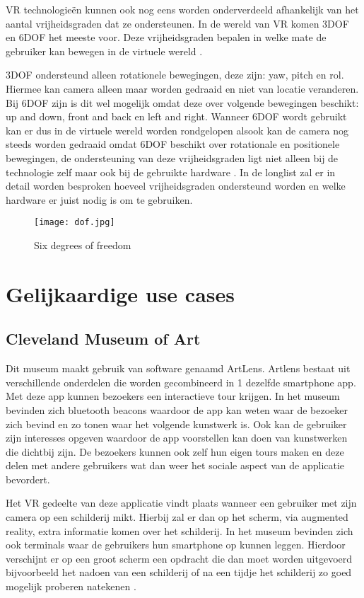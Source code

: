 VR technologieën kunnen ook nog eens worden onderverdeeld afhankelijk van het aantal vrijheidsgraden dat ze ondersteunen. In de wereld van VR komen 3DOF en 6DOF het meeste voor. Deze vrijheidsgraden bepalen in welke mate de gebruiker kan bewegen in de virtuele wereld \autocite{Shenchang1995}.

3DOF ondersteund alleen rotationele bewegingen, deze zijn: yaw, pitch en rol. Hiermee kan camera alleen maar worden gedraaid en niet van locatie veranderen. Bij 6DOF zijn is dit wel mogelijk omdat deze over volgende bewegingen beschikt: up and down, front and back en left and right. 
Wanneer 6DOF wordt gebruikt kan er dus in de virtuele wereld worden rondgelopen alsook kan de camera nog steeds worden gedraaid omdat 6DOF beschikt over rotationale en positionele bewegingen, de ondersteuning van deze vrijheidsgraden ligt niet alleen bij de technologie zelf maar ook bij de gebruikte hardware \autocite{Shenchang1995}. In de longlist zal er in detail worden besproken hoeveel vrijheidsgraden ondersteund worden en welke hardware er juist nodig is om te gebruiken.

\begin{figure}
    \texttt{[image: dof.jpg]}
    \caption{Six degrees of freedom}
    \label{fig:dof}
\end{figure}

\section{Gelijkaardige use cases}
\subsection{Cleveland Museum of Art}
Dit museum maakt gebruik van software genaamd ArtLens. Artlens bestaat uit verschillende onderdelen die worden gecombineerd in 1 dezelfde smartphone app. Met deze app kunnen bezoekers een interactieve tour krijgen. In het museum bevinden zich bluetooth beacons waardoor de app kan weten waar de bezoeker zich bevind en zo tonen waar het volgende kunstwerk is. Ook kan de gebruiker zijn interesses opgeven waardoor de app voorstellen kan doen van kunstwerken die dichtbij zijn. 
De bezoekers kunnen ook zelf hun eigen tours maken en deze delen met andere gebruikers wat dan weer het sociale aspect van de applicatie bevordert.

Het VR gedeelte van deze applicatie vindt plaats wanneer een gebruiker met zijn camera op een schilderij mikt. Hierbij zal er dan op het scherm, via augmented reality, extra informatie komen over het schilderij.
In het museum bevinden zich ook terminals waar de gebruikers hun smartphone op kunnen leggen. Hierdoor verschijnt er op een groot scherm een opdracht die dan moet worden uitgevoerd bijvoorbeeld het nadoen van een schilderij of na een tijdje het schilderij zo goed mogelijk proberen natekenen \autocite{Ding2017}.

